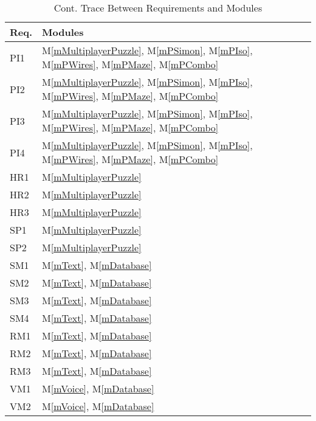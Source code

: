 \documentclass[12pt, titlepage]{article}
\newcommand{\mref}[1]{M\ref{#1}}
\begin{document}
\begin{table}[H]
\centering
\begin{tabular}{p{} p{}}
\toprule
\textbf{Req.} & \textbf{Modules}\\
\midrule
PI1 & \mref{mMultiplayerPuzzle}, \mref{mPSimon}, \mref{mPIso}, \mref{mPWires}, \mref{mPMaze},  \mref{mPCombo} \\
PI2 & \mref{mMultiplayerPuzzle}, \mref{mPSimon}, \mref{mPIso}, \mref{mPWires}, \mref{mPMaze},  \mref{mPCombo}\\
PI3 & \mref{mMultiplayerPuzzle}, \mref{mPSimon}, \mref{mPIso}, \mref{mPWires}, \mref{mPMaze},  \mref{mPCombo}\\
PI4 & \mref{mMultiplayerPuzzle}, \mref{mPSimon}, \mref{mPIso}, \mref{mPWires}, \mref{mPMaze}, \mref{mPCombo}\\
HR1 & \mref{mMultiplayerPuzzle}\\
HR2 & \mref{mMultiplayerPuzzle}\\
HR3 & \mref{mMultiplayerPuzzle}\\
SP1 & \mref{mMultiplayerPuzzle}\\
SP2 & \mref{mMultiplayerPuzzle}\\
SM1 & \mref{mText}, \mref{mDatabase}\\
SM2 & \mref{mText}, \mref{mDatabase}\\
SM3 & \mref{mText}, \mref{mDatabase}\\
SM4 & \mref{mText}, \mref{mDatabase}\\
RM1 & \mref{mText}, \mref{mDatabase}\\
RM2 & \mref{mText}, \mref{mDatabase}\\
RM3 & \mref{mText}, \mref{mDatabase}\\
VM1 & \mref{mVoice}, \mref{mDatabase}\\
VM2 & \mref{mVoice}, \mref{mDatabase}\\


\bottomrule
\end{tabular}
\caption{Cont. Trace Between Requirements and Modules}
\label{TblRT2}
\end{table}
\end{document}
